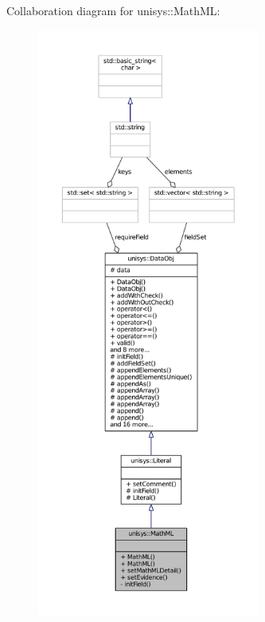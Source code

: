 Collaboration diagram for unisys\-:\-:Math\-M\-L\-:
\nopagebreak
\begin{figure}[H]
\begin{center}
\leavevmode
\includegraphics[height=550pt]{classunisys_1_1MathML__coll__graph}
\end{center}
\end{figure}
